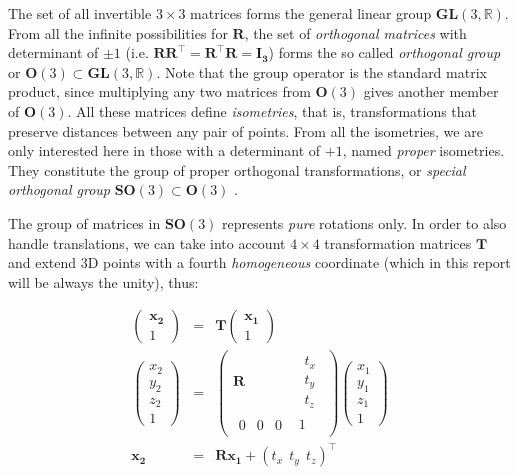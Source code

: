 \documentclass[a4paper,11pt]{report}
\begin{document}
The set of all invertible $3 \times 3$ matrices forms the
general linear group $\mathbf{GL}(3,\mathbb{R})$.
From all the infinite possibilities for $\mathbf{R}$, the set
of \emph{orthogonal matrices} with determinant of $\pm 1$
(i.e. $\mathbf{R}\mathbf{R}^\top=\mathbf{R}^\top\mathbf{R} = \mathbf{I_3}$)
forms the so called \emph{orthogonal group} or $\mathbf{O}(3) \subset \mathbf{GL}(3,\mathbb{R})$.
Note that the group operator is the standard matrix product, since multiplying
any two matrices from $\mathbf{O}(3)$ gives another member of $\mathbf{O}(3)$.
All these matrices define \emph{isometries}, that is, transformations that
preserve distances between any pair of points.
From all the isometries, we are only interested here in those with a
determinant of $+1$, named \emph{proper} isometries.
They constitute the group of proper orthogonal transformations, or
\emph{special orthogonal group} $\mathbf{SO}(3) \subset \mathbf{O}(3)$
\cite{gallier2001geometric}.

The group of matrices in $\mathbf{SO}(3)$ represents \emph{pure} rotations only.
In order to also handle translations, we can take into account $4 \times 4$
transformation matrices $\mathbf{T}$ and extend 3D points with a fourth
\emph{homogeneous} coordinate (which in this report will be always the unity),
thus:

\begin{eqnarray}
\left(
\begin{array}{c}
 \mathbf{x_2} \\ 1
\end{array}
\right)
&=&
\mathbf{T}
\left(
\begin{array}{c}
 \mathbf{x_1} \\ 1
\end{array}
\right)
\nonumber \\
\label{eq:x2_T_x1}
\left(
\begin{array}{c}
 x_2 \\ y_2 \\ z_2 \\ 1
\end{array}
\right)
&=&
\left(
\begin{array}{c|c}
\mathbf{R} &
 \begin{array}{c}
   t_x \\ t_y \\ t_z
 \end{array} \\
\hline
 \begin{array}{ccc}
  0 & 0 & 0
 \end{array}
 &
 1
\end{array}
\right)
\left(
\begin{array}{c}
 x_1 \\ y_1 \\ z_1 \\ 1
\end{array}
\right)
\\
\mathbf{x_2} &=& \mathbf{R} \mathbf{x_1} +
\left(
t_x ~~ t_y ~~ t_z
\right)^\top \nonumber
\end{eqnarray}
\end{document}
